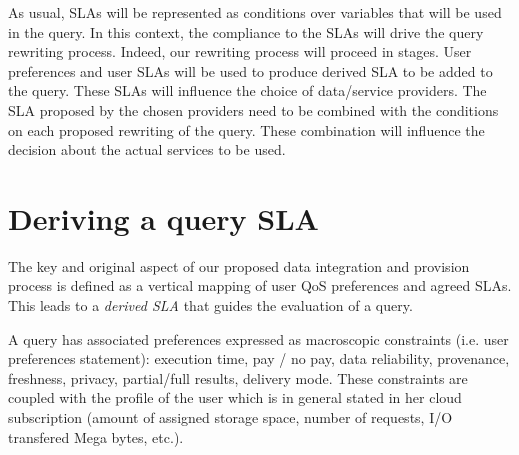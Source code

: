As usual, SLAs will be represented as conditions over variables that will be used in the query.
In this context, the compliance to the SLAs will drive the query rewriting process.
Indeed, our rewriting process will proceed in stages.
User preferences and user SLAs will be used to produce derived SLA to be added to the query. 
These SLAs will influence the choice of data/service providers.
The SLA proposed by the chosen providers need to be combined with the conditions on each proposed rewriting of the query.
These combination will influence the decision about the actual services to be used.



\section{Deriving a query SLA}
\label{sec:slaModel}

%

The key and original aspect of   our proposed data integration and provision process is  defined as a vertical mapping of user QoS preferences and agreed SLAs. This  leads to a {\em derived SLA} that guides the evaluation of a query. 

A query has associated preferences  expressed as macroscopic constraints (i.e. user preferences statement): execution time, pay / no pay, data reliability, provenance, freshness, privacy, partial/full results, delivery mode. These constraints are coupled with the profile of the user which is in general stated in her cloud subscription (amount of assigned storage space, number of requests, I/O transfered Mega bytes, etc.). 



